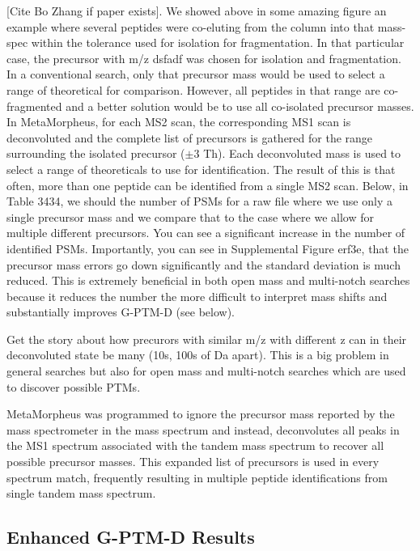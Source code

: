 \documentclass[journal=jprobs,manuscript=article]{achemso}
\begin{document}
[Cite Bo Zhang if paper exists].
We showed above in some amazing figure an example where several peptides were co-eluting from the column into that mass-spec within the tolerance used for isolation for fragmentation.
In that particular case, the precursor with m/z dsfadf was chosen for isolation and fragmentation.
In a conventional search, only that precursor mass would be used to select a range of theoretical for comparison.
However, all peptides in that range are co-fragmented and a better solution would be to use all co-isolated precursor masses.
In MetaMorpheus, for each MS2 scan, the corresponding MS1 scan is deconvoluted and the complete list of precursors is gathered for the range surrounding the isolated precursor ($\pm 3$ Th).
Each deconvoluted mass is used to select a range of theoreticals to use for identification.
The result of this is that often, more than one peptide can be identified from a single MS2 scan.
Below, in Table 3434, we should the number of PSMs for a raw file where we use only a single precursor mass and we compare that to the case where we allow for multiple different precursors.
You can see a significant increase in the number of identified PSMs.
Importantly, you can see in Supplemental Figure erf3e, that the precursor mass errors go down significantly and the standard deviation is much reduced.
This is extremely beneficial in both open mass and multi-notch searches because it reduces the number the more difficult to interpret mass shifts and substantially improves G-PTM-D (see below).

Get the story about how precurors with similar m/z with different z can in their deconvoluted state be many (10s, 100s of Da apart).
This is a big problem in general searches but also for open mass and multi-notch searches which are used to discover possible PTMs.

MetaMorpheus was programmed to ignore the precursor mass reported by the mass spectrometer in the mass spectrum and instead, deconvolutes all peaks in the MS1 spectrum associated with the tandem mass spectrum to recover all possible precursor masses.
This expanded list of precursors is used in every spectrum match, frequently resulting in multiple peptide identifications from single tandem mass spectrum.


\subsection{Enhanced G-PTM-D Results}
\end{document}

